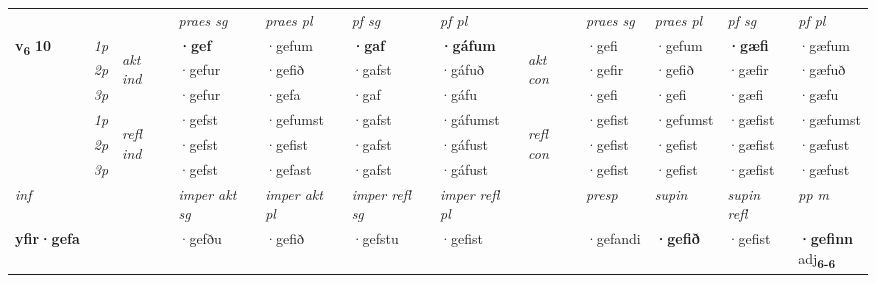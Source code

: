 \begin{longtable}[l]{X>{\footnotesize\itshape}llXXXXlXXXX}
\midrule

 & &   & \textit{praes sg}  & \textit{praes pl}    & \textit{ pf sg} & \textit{pf pl} & & \textit{praes sg}  & \textit{praes pl}    & \textit{pf sg} & \textit{pf pl }  \\ \cmidrule{4-7} \cmidrule{9-12}
 \multirow{2}{*}{{{\textbf{v{\textsubscript{6}}} \Large{\textbf{10}}}}}  & 1p & \multirow{3}{*}{\begin{turn}{90}\textit{akt ind}\end{turn}} & \textbf{·gef} & ·gefum & \textbf{·gaf} & \textbf{·gáfum} & \multirow{3}{*}{\begin{turn}{90}\textit{akt con}\end{turn}} &·gefi & ·gefum & \textbf{·gæfi} & ·gæfum\\*
 & 2p &  &  ·gefur  & ·gefið & ·gafst & ·gáfuð & & ·gefir & ·gefið & ·gæfir & ·gæfuð \\*
 & 3p &  & ·gefur & ·gefa & ·gaf & ·gáfu & & ·gefi & ·gefi& ·gæfi & ·gæfu \\*
\cmidrule{4-7} \cmidrule{9-12}
 & 1p & \multirow{3}{*}{\begin{turn}{90}\textit{refl ind}\end{turn}}  & ·gefst & ·gefumst & ·gafst & ·gáfumst & \multirow{3}{*}{\begin{turn}{90}\textit{refl con}\end{turn}}  &·gefist & ·gefumst & ·gæfist & ·gæfumst \\*
 & 2p &  & ·gefst & ·gefist & ·gafst & ·gáfust & &·gefist & ·gefist & ·gæfist & ·gæfust \\*
 & 3p  & & ·gefst & ·gefast & ·gafst & ·gáfust & & ·gefist & ·gefist& ·gæfist & ·gæfust \\*
\cmidrule{4-7} \cmidrule{9-12}

   {\textit{inf}} & &  & \textit{imper akt sg} & \textit{imper akt pl} & \textit{imper refl sg} & \textit{imper refl pl} && \textit{presp} & \textit{supin} & \textit{supin refl} & \textit{pp m} \\*
  {\textbf{yfir\allowbreak ·gefa}} & && ·gefðu  & ·gefið & ·gefstu & ·gefist && ·gefandi &  \textbf{·gefið} & ·gefist & \specialcell{\textbf{·gefinn} \\ adj\textbf{\textsubscript{6-6}}} \\*

\midrule


\end{longtable}
